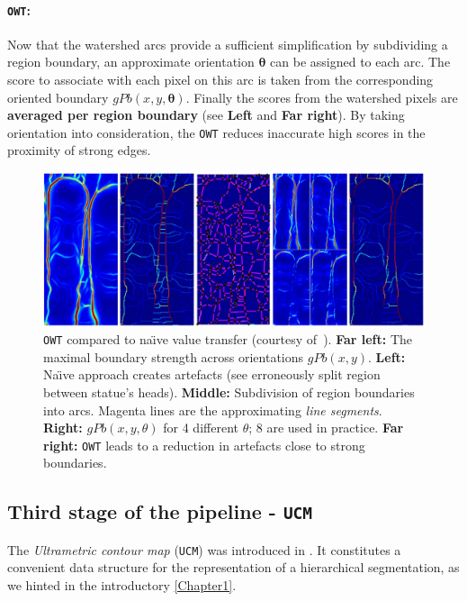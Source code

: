 \paragraph{{\tt OWT}:}
Now that the watershed arcs provide a sufficient simplification by subdividing a region boundary, an approximate orientation $\mathbf\theta$ can be assigned to each arc. The score to associate with each pixel on this arc is taken from the corresponding oriented boundary $gPb(x,y,\mathbf{\theta})$. Finally the scores from the watershed pixels are {\bf averaged per region boundary} (see  {\bf Left} and {\bf Far right}). 
By taking orientation into consideration, the {\tt OWT} reduces inaccurate high scores in the proximity of strong edges.

\begin{figure}[ht!]
 \centering
 \includegraphics[width=1\textwidth]{images/gPb-OWT-UCM/OWT_Arbelaez11.png}
 \caption[{\tt OWT} compared to na\"{\i}ve value transfer]{{\tt OWT} compared to na\"{\i}ve value transfer (courtesy of~\cite{Arbelaez11}). {\bf Far left:} The maximal boundary strength across orientations $gPb(x,y)$. {\bf Left:} Na\"{\i}ve approach creates artefacts (see erroneously split region between statue's heads). {\bf Middle:} Subdivision of region boundaries into arcs. Magenta lines are the approximating {\it line segments}. {\bf Right:} $gPb(x,y,\theta)$ for 4 different $\theta$; 8 are used in practice. {\bf Far right:} {\tt OWT} leads to a reduction in artefacts close to strong boundaries.}
 \label{fig:OWT_Arbelaez11}
\end{figure}


\subsection{Third stage of the pipeline - {\tt UCM}}
\label{sec:ch3-UCM}
The {\it Ultrametric contour map} ({\tt UCM}) was introduced in \cite{Arbelaez2006boundary}. It constitutes a convenient data structure for the representation of a hierarchical segmentation, as we hinted in the introductory \cref{Chapter1}. 

